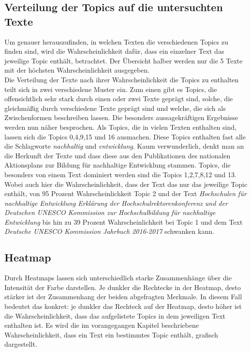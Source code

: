 \documentclass[letterpaper]{article}
\begin{document}
\subsection{Verteilung der Topics auf die untersuchten Texte}
Um genauer herauszufinden, in welchen Texten die verschiedenen Topics zu finden sind, wird die Wahrscheinlichkeit dafür, dass ein einzelner Text das jeweilige Topic enthält, betrachtet. Der Übersicht halber werden nur die 5 Texte mit der höchsten Wahrscheinlichkeit ausgegeben.\\
Die Verteilung der Texte nach ihrer Wahrscheinlichkeit die Topics zu enthalten teilt sich in zwei verschiedene Muster ein. Zum einen gibt es Topics, die offensichtlich sehr stark durch einen oder zwei Texte geprägt sind, solche, die gleichmäßig durch verschiedene Texte geprägt sind und welche, die sich als Zwischenformen beschreiben lassen. Die besonders aussagekräftigen Ergebnisse werden nun näher besprochen. Als Topics, die in vielen Texten enthalten sind, lassen sich die Topics 0,4,9,15 und 16 ausmachen. Diese Topics enthalten fast alle die Schlagworte \textit{nachhaltig} und \textit{entwicklung}. Kaum verwunderlich, denkt man an die Herkunft der Texte und dass diese aus den Publikationen des nationalen Aktionsplans zur Bildung für nachhaltige Entwicklung stammen. 
Topics, die besonders von einem Text dominiert werden sind die Topics 1,2,7,8,12 und 13. Wobei auch hier die Wahrscheinlichkeit, dass der Text das nur das jeweilige Topic enthält, von 95 Prozent Wahrscheinlichkeit Topic 2 und der Text \textit{Hochschulen für nachhaltige Entwicklung Erklärung der Hochschulrektorenkonferenz und der Deutschen UNESCO Kommission zur Hochschulbildung für nachhaltige Entwicklung} bis hin zu 39 Prozent Wahrscheinlichkeit bei Topic 1 und dem Text \textit{Deutsche UNESCO Kommission Jahrbuch 2016-2017} schwanken kann. 

\subsection{Heatmap}
Durch Heatmaps lassen sich unterschiedlich starke Zusammenhänge über die Intensität der Farbe darstellen. Je dunkler die Rechtecke in der Heatmap, desto stärker ist der Zusammenhang der beiden abgefragten Merkmale. In diesem Fall bedeutet das konkret: je dunkler das Rechteck auf der Heatmap, desto höher ist die Wahrscheinlichkeit, dass das aufgelistete Topics in dem jeweiligen Text enthalten ist. Es wird die im vorangegangen Kapitel beschriebene Wahrscheinlichkeit, dass ein Text ein bestimmtes Topic enthält, grafisch dargestellt.
 
\end{document}
